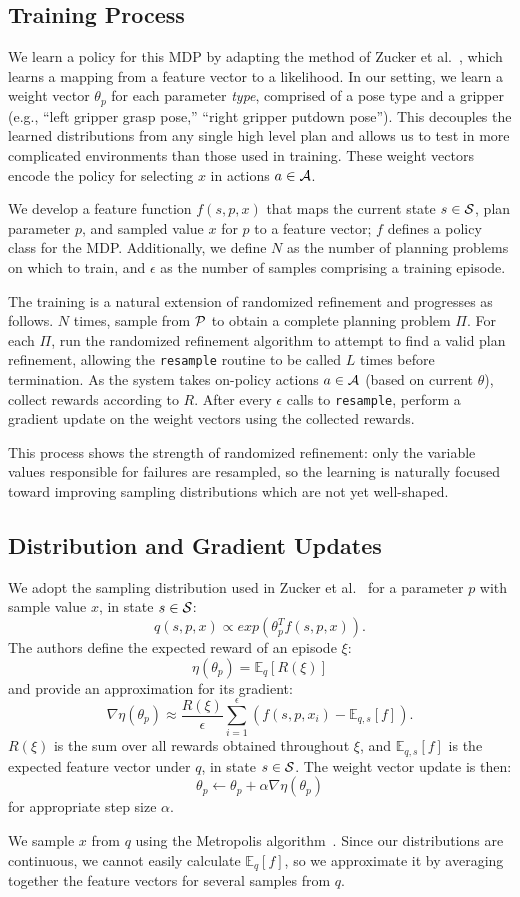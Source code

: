 \subsection{Training Process}
We learn a policy for this MDP by adapting the method of Zucker et al.~\cite{workspacebias}, which
learns a mapping from a feature vector to a likelihood. In our setting, we learn a weight
vector $\theta_{p}$ for each parameter \emph{type}, comprised of a pose type and a gripper
(e.g., ``left gripper grasp pose,'' ``right gripper putdown pose''). This decouples the learned
distributions from any single high level plan and allows us to test in more complicated environments
than those used in training. These weight vectors encode the policy for selecting $x$ in actions $a \in \mathcal{A}$.

We develop a feature function $f(s, p, x)$ that maps the current
state $s \in \mathcal{S}$, plan parameter $p$, and sampled value $x$ for $p$ to a
feature vector; $f$ defines a policy class for the MDP. Additionally, we define
$N$ as the number of planning problems on which to train, and
$\epsilon$ as the number of samples comprising a training episode.

The training is a natural extension of randomized
refinement and progresses as follows. $N$ times, sample from $\mathcal{P}$ to obtain
a complete planning problem $\Pi$. For each $\Pi$, run the randomized refinement
algorithm to attempt to find a valid plan refinement, allowing the \texttt{resample}
routine to be called $L$ times before termination. As the system takes on-policy actions $a \in \mathcal{A}$ (based on
current $\theta$), collect rewards according to $R$. After every $\epsilon$ calls to
\texttt{resample}, perform a gradient update on the weight vectors using the
collected rewards.

This process shows the strength of randomized refinement: only the variable
values responsible for failures are resampled, so the learning is naturally
focused toward improving sampling distributions which are not yet well-shaped.

\subsection{Distribution and Gradient Updates}
We adopt the sampling distribution used in Zucker et al.~\cite{workspacebias}
for a parameter $p$ with sample value $x$, in state $s \in \mathcal{S}$:
$$q(s, p, x) \propto exp(\theta_{p}^{T} f(s, p, x)).$$
The authors define the expected reward of an episode $\xi$:
$$\eta(\theta_{p}) = \mathbb{E}_{q}[R(\xi)]$$ and provide an approximation for its gradient:
$$\nabla \eta(\theta_{p}) \approx \frac{R(\xi)}{\epsilon} \sum_{i=1}^{\epsilon}(f(s, p, x_{i}) - \mathbb{E}_{q,s}[f]).$$
$R(\xi)$ is the sum over all rewards obtained throughout $\xi$, and
$\mathbb{E}_{q,s}[f]$ is the expected feature vector under $q$, in state $s \in \mathcal{S}$. The weight vector update is then:
$$\theta_{p} \leftarrow \theta_{p} + \alpha \nabla \eta(\theta_{p})$$
for appropriate step size $\alpha$.

We sample $x$ from $q$ using the Metropolis algorithm~\cite{chib1995understanding}.
Since our distributions are continuous, we cannot easily calculate $\mathbb{E}_{q}[f]$,
so we approximate it by averaging together the feature vectors for several samples from $q$.